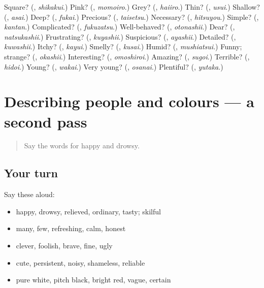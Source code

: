 \begin{tcolorbox}[breakable,colback=teal!4,colframe=teal!35!black,title={Before you move on}]
Square? (\textbf{}, \emph{shikakui}.) Pink? (\textbf{}, \emph{momoiro}.) Grey? (\textbf{}, \emph{haiiro}.) Thin? (\textbf{}, \emph{usui}.) Shallow? (\textbf{}, \emph{asai}.) Deep? (\textbf{}, \emph{fukai}.) Precious? (\textbf{}, \emph{taisetsu}.) Necessary? (\textbf{}, \emph{hitsuyou}.) Simple? (\textbf{}, \emph{kantan}.) Complicated? (\textbf{}, \emph{fukuzatsu}.) Well-behaved? (\textbf{}, \emph{otonashii}.) Dear? (\textbf{}, \emph{natsukashii}.) Frustrating? (\textbf{}, \emph{kuyashii}.) Suspicious? (\textbf{}, \emph{ayashii}.) Detailed? (\textbf{}, \emph{kuwashii}.) Itchy? (\textbf{}, \emph{kayui}.) Smelly? (\textbf{}, \emph{kusai}.) Humid? (\textbf{}, \emph{mushiatsui}.) Funny; strange? (\textbf{}, \emph{okashii}.) Interesting? (\textbf{}, \emph{omoshiroi}.) Amazing? (\textbf{}, \emph{sugoi}.) Terrible? (\textbf{}, \emph{hidoi}.) Young? (\textbf{}, \emph{wakai}.) Very young? (\textbf{}, \emph{osanai}.) Plentiful? (\textbf{}, \emph{yutaka}.)
\end{tcolorbox}
\section[(dialogue)]{Describing people and colours — a second pass}

\label{lesson:JA-R130-second-pass-describing-people-and-colours}



\begin{quote}
Say the words for happy and drowsy.
\end{quote}

\subsection*{Your turn}
Say these aloud:

\begin{itemize}
\raggedright
  \item happy, drowsy, relieved, ordinary, tasty; skilful
  \item many, few, refreshing, calm, honest
  \item clever, foolish, brave, fine, ugly
  \item cute, persistent, noisy, shameless, reliable
  \item pure white, pitch black, bright red, vague, certain
\end{itemize}

